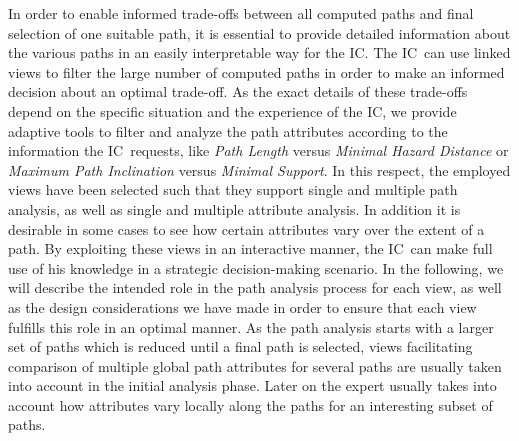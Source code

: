 \documentclass[review,journal]{vgtc}         %
\def\IC{IC}
\begin{document}
In order to enable informed trade-offs between all computed paths and final selection of one suitable path, it is essential to provide detailed information about the various paths in an easily interpretable way for the \IC . The \IC\ can use linked views to filter the large number of computed paths in order to make an informed decision about an optimal trade-off. As the exact details of these trade-offs depend on the specific situation and the experience of the \IC, we provide adaptive tools to filter and analyze the path attributes according to the information the \IC\ requests, like \emph{Path Length} versus \emph{Minimal Hazard Distance} or \emph{Maximum Path Inclination} versus \emph{Minimal Support}. In this respect, the employed views have been selected such that they support single and multiple path analysis, as well as single and multiple attribute analysis. In addition it is desirable in some cases to see how certain attributes vary over the extent of a path. By exploiting these views in an interactive manner, the \IC\ can make full use of his knowledge in a strategic decision-making scenario. In the following, we will describe the intended role in the path analysis process for each view, as well as the design considerations we have made in order to ensure that each view fulfills this role in an optimal manner. As the path analysis starts with a larger set of paths which is reduced until a final path is selected, views facilitating comparison of multiple global path attributes for several paths are usually taken into account in the initial analysis phase. Later on the expert usually takes into account how attributes vary locally along the paths for an interesting subset of paths.
\end{document}
